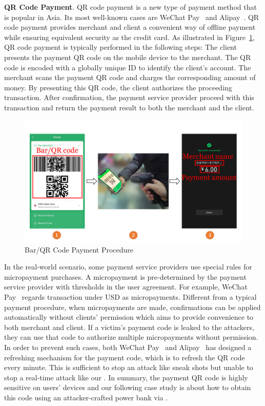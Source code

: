 \textbf{QR Code Payment}.
QR code payment is a new type of payment method that is popular in Asia. Its most well-known cases are WeChat Pay~\cite{Wechat-pay} and Alipay~\cite{AliPay}. QR code payment provides merchant and client a convenient way of offline payment while ensuring equivalent security as the credit card.
As illustrated in Figure~\ref{fig:qr_payment_procedure}, QR code payment is typically performed in the following steps:
 The client presents the payment QR code on the mobile device to the merchant.
The QR code is encoded with a globally unique ID to identify the client's account.
 The merchant scans the payment QR code and charges the corresponding amount of money.
By presenting this QR code, the client authorizes the proceeding transaction.
 After confirmation, the payment service provider proceed with this transaction and return the payment result to both the merchant and the client.

\begin{figure}[t]
	\centering
	\includegraphics[width=\linewidth]{./Figs/qr_code_payment.png}
	\caption{Bar/QR Code Payment Procedure}
	\label{fig:qr_payment_procedure}
\end{figure}


In the real-world scenario, some payment service providers use special rules
for micropayment purchases.  A micropayment is pre-determined by the payment
service provider with thresholds in the user agreement.  For example, WeChat
Pay~\cite{Wechat-pay} regards transaction under USD  as
micropayments.  Different from a typical payment procedure, when micropayments
are made, confirmations can be applied automatically without clients'
permission which aims to provide convenience to both merchant and client.  If a
victim's payment code is leaked to the attackers, they can use that code to
authorize multiple micropayments without permission.  In order to prevent such
cases, both WeChat Pay~\cite{Wechat-pay} and Alipay~\cite{AliPay} has designed a refreshing mechanism for the
payment code, which is to refresh the QR code every minute. This is sufficient
to stop an attack like sneak shots but unable to stop a real-time attack like our
\tool.  In summary, the payment QR code is highly sensitive on users' devices
and our following case study is about how to obtain this code using an
attacker-crafted power bank via \tool.

